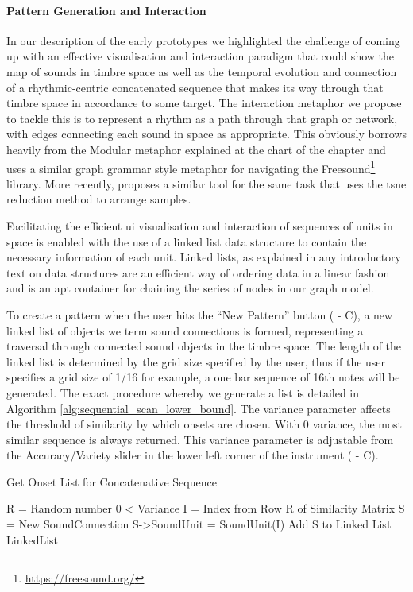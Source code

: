 \paragraph{Pattern Generation and Interaction}

In our description of the early prototypes we highlighted the challenge of coming up with an effective visualisation and interaction paradigm that could show the map of sounds in timbre space as well as the temporal evolution and connection of a rhythmic-centric concatenated sequence that makes its way through that timbre space in accordance to some target. The interaction metaphor we propose to tackle this is to represent a rhythm as a path through that graph or network, with edges connecting each sound in space as appropriate. This obviously borrows heavily from the Modular metaphor explained at the chart of the chapter and \citep{Roma2010} uses a similar graph grammar style metaphor for navigating the Freesound\footnote{\url{https://freesound.org/}} library. More recently, \cite{Font2017} proposes a similar tool for the same task that uses the \acrshort{tsne} reduction method to arrange samples.

Facilitating the efficient \acrshort{ui} visualisation and interaction of sequences of units in space is enabled with the use of a linked list data structure to contain the necessary information of each unit. Linked lists, as explained in any introductory text on data structures are an efficient way of ordering data in a linear fashion and is an apt container for chaining the series of nodes in our graph model.

To create a pattern when the user hits the ``New Pattern'' button ( - C), a new linked list of objects we term sound connections is formed, representing a traversal through connected sound objects in the timbre space. The length of the linked list is determined by the grid size specified by the user, thus if the user specifies a grid size of 1/16 for example, a one bar sequence of 16th notes will be generated. The exact procedure whereby we generate a list is detailed in Algorithm \ref{alg:sequential_scan_lower_bound}. The variance parameter affects the threshold of similarity by which onsets are chosen. With 0 variance, the most similar sequence is always returned. This variance parameter is adjustable from the Accuracy/Variety slider in the lower left corner of the instrument ( - C).

\begin{algorithm}
	\caption{Get Onset List for Concatenative Sequence}
	\label{alg:sequential_scan_lower_bound}
	\begin{algorithmic}
			\State R = Random number 0 < Variance
			\State I = Index from Row R of Similarity Matrix
			\State S = New SoundConnection
			\State S->SoundUnit = SoundUnit(I)
			\State Add S to Linked List
		\EndFor
		\\
	\Return	LinkedList	
	\end{algorithmic}
\end{algorithm}
 
